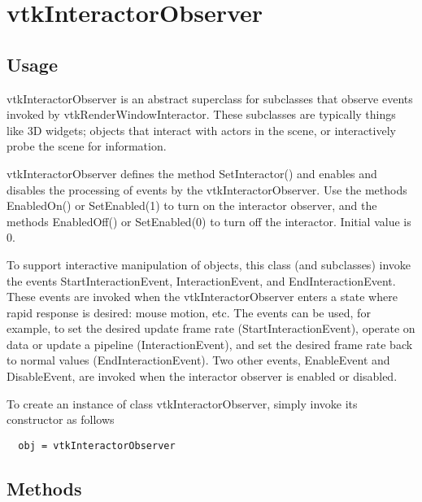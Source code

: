 \section{vtkInteractorObserver}

\subsection{Usage}

 vtkInteractorObserver is an abstract superclass for subclasses that observe
 events invoked by vtkRenderWindowInteractor. These subclasses are 
 typically things like 3D widgets; objects that interact with actors
 in the scene, or interactively probe the scene for information.

 vtkInteractorObserver defines the method SetInteractor() and enables and
 disables the processing of events by the vtkInteractorObserver. Use the
 methods EnabledOn() or SetEnabled(1) to turn on the interactor observer,
 and the methods EnabledOff() or SetEnabled(0) to turn off the interactor.
 Initial value is 0.

 To support interactive manipulation of objects, this class (and
 subclasses) invoke the events StartInteractionEvent, InteractionEvent, and
 EndInteractionEvent.  These events are invoked when the
 vtkInteractorObserver enters a state where rapid response is desired:
 mouse motion, etc. The events can be used, for example, to set the desired
 update frame rate (StartInteractionEvent), operate on data or update a
 pipeline (InteractionEvent), and set the desired frame rate back to normal
 values (EndInteractionEvent). Two other events, EnableEvent and
 DisableEvent, are invoked when the interactor observer is enabled or
 disabled.

To create an instance of class vtkInteractorObserver, simply
invoke its constructor as follows
\begin{verbatim}
  obj = vtkInteractorObserver
\end{verbatim}
\subsection{Methods}

